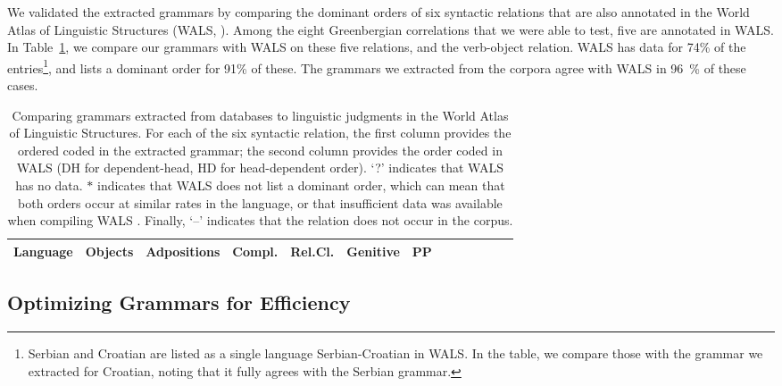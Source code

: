 \documentclass[10pt,twoside,lineno]{article}
\begin{document}
We validated the extracted grammars by comparing the dominant orders of six syntactic relations that are also annotated in the World Atlas of Linguistic Structures (WALS, \cite{haspelmath2005world}).
Among the eight Greenbergian correlations that we were able to test, five are annotated in WALS.
In Table~\ref{tab:grammars-wals}, we compare our grammars with WALS on these five relations, and the verb-object relation.
WALS has data for 74\% of the entries\footnote{Serbian and Croatian are listed as a single language Serbian-Croatian in WALS. In the table, we compare those with the grammar we extracted for Croatian, noting that it fully agrees with the Serbian grammar.}, and lists a dominant order for 91\% of these.
The grammars we extracted from the corpora agree with WALS in 96~\%  of these cases.


\begin{table}
\small{
\begin{center}
\begin{tabular}{l||ll|ll|ll|ll|ll|ll|llllll}
		   Language 
		   &	\multicolumn{2}{|c|}{Objects} 
		   &	\multicolumn{2}{|c|}{Adpositions} 
		   &	\multicolumn{2}{|c|}{Compl.} 
		   &	\multicolumn{2}{|c|}{Rel.Cl.} 
		   &	\multicolumn{2}{|c|}{Genitive} 
		   &	\multicolumn{2}{|c|}{PP}  \\ \hline\hline
	
\end{tabular}
\end{center}
}
\caption{Comparing grammars extracted from databases to linguistic judgments in the World Atlas of Linguistic Structures. For each of the six syntactic relation, the first column provides the ordered coded in the extracted grammar; the second column provides the order coded in WALS (DH for dependent-head, HD for head-dependent order). `?' indicates that WALS has no data.
$*$ indicates that WALS does not list a dominant order, which can mean that both orders occur at similar rates in the language, or that insufficient data was available when compiling WALS \citep{dryer2011evidence}.
Finally, `--' indicates that the relation does not occur in the corpus.
}\label{tab:grammars-wals}
\end{table}




\subsection{Optimizing Grammars for Efficiency}\label{sec:optim-eff}
\end{document}
